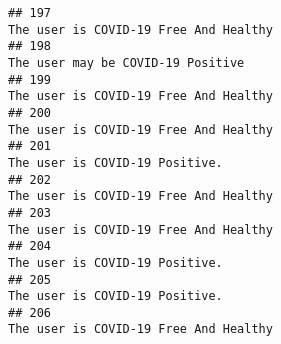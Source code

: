 \documentclass[
]{article}
\begin{document}
\begin{verbatim}
## 197                                                                                                                                                                                                                              The user is COVID-19 Free And Healthy
## 198                                                                                                                                                                                                                                  The user may be COVID-19 Positive
## 199                                                                                                                                                                                                                              The user is COVID-19 Free And Healthy
## 200                                                                                                                                                                                                                              The user is COVID-19 Free And Healthy
## 201                                                                                                                                                                                                                                     The user is COVID-19 Positive.
## 202                                                                                                                                                                                                                              The user is COVID-19 Free And Healthy
## 203                                                                                                                                                                                                                              The user is COVID-19 Free And Healthy
## 204                                                                                                                                                                                                                                     The user is COVID-19 Positive.
## 205                                                                                                                                                                                                                                     The user is COVID-19 Positive.
## 206                                                                                                                                                                                                                              The user is COVID-19 Free And Healthy

\end{verbatim}
\end{document}
